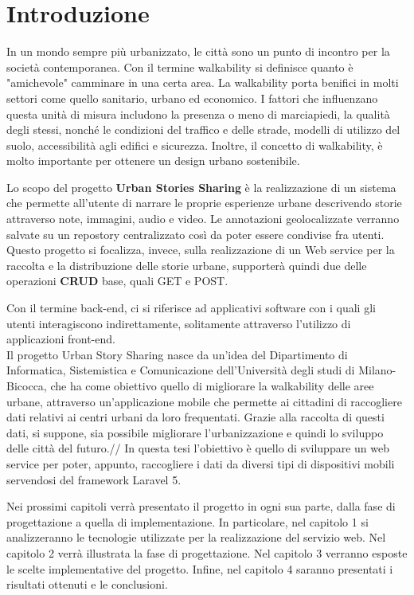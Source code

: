\chapter*{Introduzione}

In un mondo sempre più urbanizzato, le città sono un punto di incontro per la società contemporanea.
Con il termine walkability si definisce quanto è "amichevole" camminare in una certa area. La walkability porta benifici in molti settori come quello sanitario, urbano ed economico.
I fattori che influenzano questa unità di misura includono la presenza o meno di marciapiedi, la qualità degli stessi, nonché le condizioni del traffico e delle strade, modelli di utilizzo del suolo, accessibilità agli edifici e sicurezza.
Inoltre, il concetto di walkability, è molto importante per ottenere un design urbano sostenibile.

Lo scopo del progetto \textbf{Urban Stories Sharing} è la realizzazione di un sistema che permette all'utente di narrare le proprie esperienze urbane descrivendo storie attraverso note, immagini, audio e video. Le annotazioni geolocalizzate verranno salvate su un repostory centralizzato così da poter essere condivise fra utenti. Questo progetto si focalizza, invece, sulla realizzazione di un Web service per la raccolta e la distribuzione delle storie urbane, supporterà quindi due delle operazioni \textbf{CRUD} base, quali GET e POST. 

Con il termine back-end, ci si riferisce ad applicativi software con i quali gli utenti interagiscono indirettamente, solitamente attraverso l'utilizzo di applicazioni front-end.\\
Il progetto Urban Story Sharing nasce da un'idea del Dipartimento di Informatica, Sistemistica e Comunicazione dell'Università degli studi di Milano-Bicocca, che ha come obiettivo quello di migliorare la walkability delle aree urbane, attraverso un'applicazione mobile che permette ai cittadini di raccogliere dati relativi ai centri urbani da loro frequentati.
Grazie alla raccolta di questi dati, si suppone, sia possibile migliorare l'urbanizzazione e quindi lo sviluppo delle città del futuro.//
In questa tesi l'obiettivo è quello di sviluppare un web service per poter, appunto, raccogliere i dati da diversi tipi di dispositivi mobili servendosi del framework Laravel 5.

Nei prossimi capitoli verrà presentato il progetto in ogni sua parte, dalla fase di progettazione a quella di implementazione.  In particolare, nel capitolo 1 si analizzeranno le tecnologie utilizzate per la realizzazione del servizio web. Nel capitolo 2 verrà illustrata la fase di progettazione. Nel capitolo 3 verranno esposte le scelte implementative del progetto. Infine, nel capitolo 4 saranno presentati i risultati ottenuti e le conclusioni.

